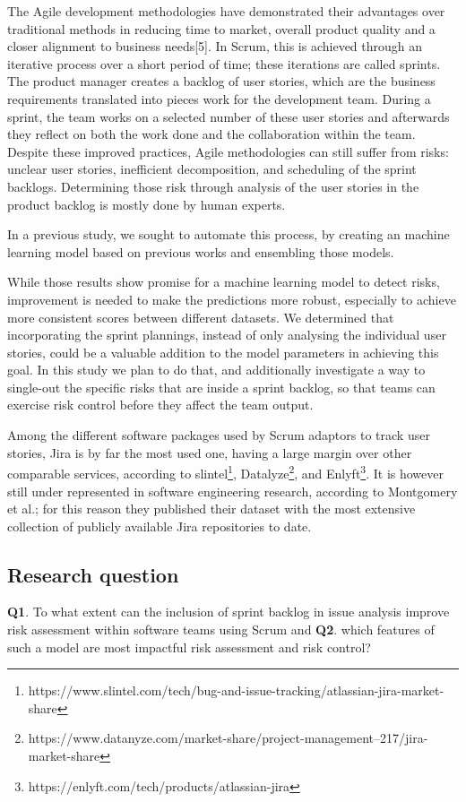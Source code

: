 \documentclass[sigconf]{acmart}
\begin{document}
The Agile development methodologies have demonstrated their advantages over traditional methods in reducing time to market, overall product quality and a closer alignment to business needs[5]. 
In Scrum, this is achieved through an iterative process over a short period of time; these iterations are called sprints.
The product manager creates a backlog of user stories, which are the business requirements translated into pieces work for the development team. 
During a sprint, the team works on a selected number of these user stories and afterwards they reflect on both the work done and the collaboration within the team.
Despite these improved practices, Agile methodologies can still suffer from risks: unclear user stories, inefficient decomposition, and scheduling of the sprint backlogs. 
Determining those risk through analysis of the user stories in the product backlog is mostly done by human experts. 

In a previous study, we sought to automate this process, by creating an machine learning model based on previous works and ensembling those models. 

While those results show promise for a machine learning model to detect risks, improvement is needed to make the predictions more robust, especially to achieve more consistent scores between different datasets.
We determined that incorporating the sprint plannings, instead of only analysing the individual user stories, could be a valuable addition to the model parameters in achieving this goal. In this study we plan to do that, and additionally investigate a way to single-out the specific risks that are inside a sprint backlog, so that teams can exercise risk control before they affect the team output.

Among the different software packages used by Scrum adaptors to track user stories, Jira is by far the most used one, having a large margin over other comparable services, according to slintel\footnote{https://www.slintel.com/tech/bug-and-issue-tracking/atlassian-jira-market-share}, Datalyze\footnote{https://www.datanyze.com/market-share/project-management--217/jira-market-share}, and Enlyft\footnote{https://enlyft.com/tech/products/atlassian-jira}. It is however still under represented in software engineering research, according to Montgomery et al.\cite{montgomery2022jira}; for this reason they published their dataset with the most extensive collection of publicly available Jira repositories to date.

\subsection{Research question}
\textbf{Q1}. To what extent can the inclusion of sprint backlog in issue analysis improve risk assessment within software teams using Scrum and \textbf{Q2}. which features of such a model are most impactful risk assessment and risk control?
\end{document}
